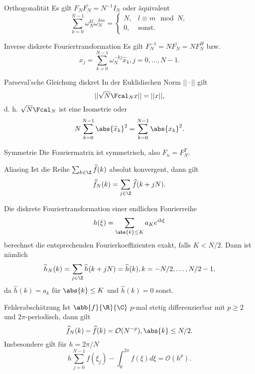 \begin{karte}{Orthogonalität}
    Es gilt \( F_N \overline{F_N} = N^{-1} I_N \) 
    oder äquivalent 
    \[ \sum_{k=0}^{N-1} \omega_N^{kl} \overline{\omega}_N^{km} = 
    \begin{cases}
        N, & l \equiv m \mod N, \\
        0, & \text{sonst}.
    \end{cases} \]
\end{karte}

\begin{karte}{Inverse diskrete Fouriertransformation}
    Es gilt \( F_N^{-1} = N \overline{F_N} = N F_N^H \) bzw. 
    \[ x_j = \sum_{k=0}^{N-1} \omega_N^{-kj} \widehat{x}_k, j=0,\ldots, N-1. \]
\end{karte}

\begin{karte}{Parseval'sche Gleichung diskret}
    In der Euklidischen Norm \( ||\cdot|| \) gilt 
    \[ || \sqrt{N} \Fcal_N x||= ||x||, \]
    d. h. \( \sqrt{N} \Fcal_N \) ist eine Isometrie oder 
    \[ N \sum_{k=0}^{N-1} \abs{\widehat{x}_k}^2 = \sum_{k=0}^{N-1} \abs{x_k}^2. \]
\end{karte}

\begin{karte}{Symmetrie}
    Die Fouriermatrix ist symmetrisch, also 
    \( F_n = F_N^T \). 
\end{karte}

\begin{karte}{Aliasing}
    Ist die Reihe \(\sum_{k\in\Z} \widehat{f}(k)\) absolut konvergent, dann gilt 
    \[ \widehat{f}_N(k) = \sum_{j\in\Z} \widehat{f}(k+jN). \]

    Die diskrete Fouriertransformation einer endlichen Fourierreihe 
    \[ h(\xi) = \sum_{\abs{k}\leq K} a_K e^{ik\xi} \]
    berechnet die entsprechenden Fourierkoeffizienten exakt, falls \(K<N/2\). 
    Dann ist nämlich 
    \[ \widehat{h}_N(k) = \sum_{j\in\Z} \widehat{h}(k+jN) = \widehat{h}(k), k = -N/2,\ldots, N/2-1, \]
    da \(\widehat{h}(k) = a_k\) für \(\abs{k} \leq K\) und \(\widehat{h}(k) = 0\) sonst.
\end{karte}

\begin{karte}{Fehlerabschätzung}
    Ist \(\abb{f}{\R}{\C}\) \(p\)-mal stetig differenzierbar mit \(p\geq 2\) und 
    \(2\pi\)-periodisch, dann gilt 
    \[ \widehat{f}_N(k) - \widehat{f}(k) = \mathcal{O}(N^{-p}), \abs{k} \leq N/2. \]
    Insbesondere gilt für \(h=2\pi/N\)
    \[ h \sum_{j=0}^{N-1} f(\xi_j) - \int_0^{2\pi} f(\xi)d\xi = \mathcal{O}(h^p). \]
\end{karte}

